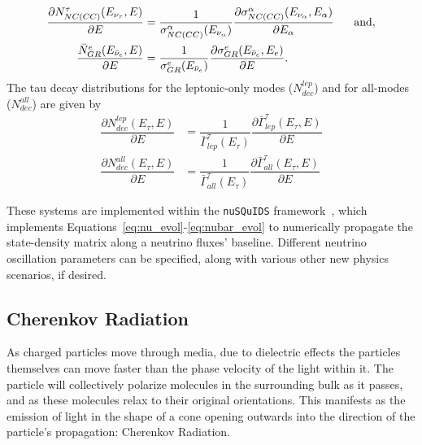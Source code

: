\documentclass[main.tex]{subfiles}
\begin{document}
\begin{align}
    \dfrac{\partial N_{NC(CC)}^{\tau} (E_{\nu_{\tau}}, E)}{\partial E} &= \dfrac{1}{\sigma_{NC(CC)}^{\alpha} (E_{\nu_{\alpha} })}\dfrac{\partial\sigma_{NC(CC)}^{\alpha}(E_{\nu_{\alpha}}, E_{\alpha})}{\partial E_{\alpha}}\hspace{0.5cm} \text{ and}, \\
    \dfrac{\bar{N}_{GR}^{e} (E_{\bar{\nu}_{e}}, E)}{\partial E} &= \dfrac{1}{\sigma_{GR}^{e}(E_{\bar{\nu}_{e}})} \dfrac{\partial\sigma_{GR}^{e}(E_{\bar{\nu}_{e}}, E_{e})}{\partial E}.
\end{align}
The tau decay distributions for the leptonic-only modes ($N_{dec}^{lep}$) and for all-modes ($N_{dec}^{all}$) are given by 
\begin{align}
    \dfrac{\partial N_{dec}^{lep}(E_{\tau}, E)}{\partial E} &= \dfrac{1}{\bar{\Gamma}_{lep}^{\tau}(E_{\tau})} \dfrac{\partial\bar{\Gamma}_{lep}^{\tau}(E_{\tau},E)}{\partial E} \\
    \dfrac{\partial N_{dec}^{all}(E_{\tau}, E)}{\partial E} &= \dfrac{1}{\bar{\Gamma}_{all}^{\tau}(E_{\tau})} \dfrac{\partial\bar{\Gamma}_{all}^{\tau}(E_{\tau},E)}{\partial E} 
\end{align}

These systems are implemented within the \texttt{nuSQuIDS} framework~\cite{arguelles:2015nu, arguelles2021nusquids}, which implements Equations~\eqref{eq:nu_evol}-\eqref{eq:nubar_evol} to numerically propagate the state-density matrix along a neutrino fluxes' baseline. 
Different neutrino oscillation parameters can be specified, along with various other new physics scenarios, if desired.

\subsection{Cherenkov Radiation}

As charged particles move through media, due to dielectric effects the particles themselves can move faster than the phase velocity of the light within it. 
The particle will collectively polarize molecules in the surrounding bulk as it passes, and as these molecules relax to their original orientations. 
This manifests as the emission of light in the shape of a cone opening outwards into the direction of the particle's propagation: Cherenkov Radiation. 
\end{document}
